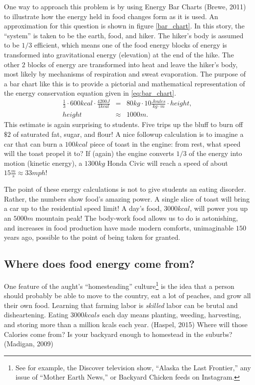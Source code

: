\documentclass[man]{apa7}
\newcommand{\bea}{\begin{eqnarray}}
\newcommand{\eea}{\end{eqnarray}}
\begin{document}
One way to approach this problem is by using Energy Bar Charts (Brewe, 2011) to illustrate how the energy held in food changes form as it is used.  An approximation for this question is shown in figure \ref{bar_chart}.  
In this story, the ``system'' is taken to be the earth, food, and hiker.  The hiker's body is assumed to be $1/3$ efficient, which means one of the food energy blocks of energy is transformed into gravitational energy (elevation) at the end of the hike.  
The other $2$ blocks of energy are transformed into heat and leave the hiker's body, most likely by mechanisms of respiration and sweat evaporation. The purpose of a bar chart like this is to provide a pictorial and mathematical representation of the energy conservation equation given in \ref{eq:bar_chart}.         
\bea
\frac{1}{3}\cdot600kcal\cdot\frac{4200J}{1kcal} 
	&=& 80kg\cdot10\frac{Joules}{kg\cdot m}\cdot height , \label{eq:bar_chart}\\
height &\approx&  1000 m .
\eea
This estimate is again surprising to students.  Five trips up the bluff to burn off $\$2$ of saturated fat, sugar, and flour!  A nice followup calculation is to imagine a car that can burn a $100kcal$ piece of toast in the engine: from rest, what speed will the toast propel it to? If (again) the engine converts $1/3$ of the energy into motion (kinetic energy), a $1300kg$ Honda Civic will reach a speed of about $15\frac{m}{s}\approx33mph$!  

The point of these energy calculations is not to give students an eating disorder.  Rather, the numbers show food's amazing power. A single slice of toast will bring a car up to the residential speed limit!  A day's food, $3000kcal$, will power you up an $5000m$ mountain peak! The body-work food allows us to do is astonishing, and increases in food production have made modern  comforts, unimaginable $150$ years ago, possible to the point of being taken for granted.  


\subsection{Where does food energy come from?}
One feature of the aught's ``homesteading'' culture\footnote{
See for example, the Discover television show, ``Alaska the Last Frontier,'' any issue of ``Mother Earth News,'' or Backyard Chicken feeds on Instagram.  
}
is the idea that a person should probably be able to move to the country, eat a lot of peaches, and grow all their own food.  Learning that farming labor is \textit{skilled} labor can be brutal and disheartening. Eating $3000kcals$ each day means planting, weeding, harvesting, and storing more than a million kcals each year. (Haspel, 2015)
Where will those Calories come from? Is your backyard enough to homestead in the suburbs?(Madigan, 2009)
\end{document}
